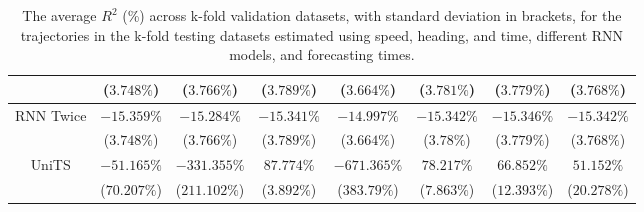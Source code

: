 \begin{table}[!ht]
{\begin{tabular}{|c|c|c|c|c|c|c|c|}
			 & ($3.748\%$) & ($3.766\%$) & ($3.789\%$) & ($3.664\%$) & ($3.781\%$) & ($3.779\%$) & ($3.768\%$) \\ \hline
			\multirow{2}{*}{RNN Twice} & $-15.359\%$ & $-15.284\%$ & $-15.341\%$ & $-14.997\%$ & $-15.342\%$ & $-15.346\%$ & $-15.342\%$ \\
			 & ($3.748\%$) & ($3.766\%$) & ($3.789\%$) & ($3.664\%$) & ($3.78\%$) & ($3.779\%$) & ($3.768\%$) \\ \hline
			\multirow{2}{*}{UniTS} & $-51.165\%$ & $-331.355\%$ & $87.774\%$ & $-671.365\%$ & $78.217\%$ & $66.852\%$ & $51.152\%$ \\
			 & ($70.207\%$) & ($211.102\%$) & ($3.892\%$) & ($383.79\%$) & ($7.863\%$) & ($12.393\%$) & ($20.278\%$) \\ \hline
		\end{tabular}
	}
	\caption{The average $R^{2}$ (\%) across k-fold validation datasets, with standard deviation in brackets, for the trajectories in the k-fold testing datasets estimated using speed, heading, and time, different RNN models, and forecasting times.}
	\label{tab:all_speed_actual_dir_R2}
\end{table}